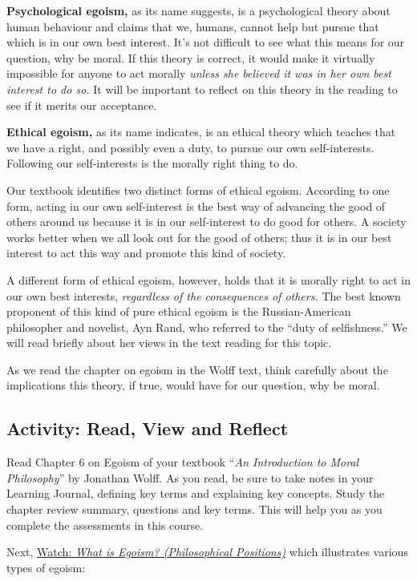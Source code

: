 \documentclass[
]{book}
\begin{document}
\textbf{Psychological egoism,} as its name suggests, is a psychological theory about human behaviour and claims that we, humans, cannot help but pursue that which is in our own best interest. It's not difficult to see what this means for our question, why be moral. If this theory is correct, it would make it virtually impossible for anyone to act morally \emph{unless she believed it was in her own best interest to do so.} It will be important to reflect on this theory in the reading to see if it merits our acceptance.

\textbf{Ethical egoism,} as its name indicates, is an ethical theory which teaches that we have a right, and possibly even a duty, to pursue our own self-interests. Following our self-interests is the morally right thing to do.

Our textbook identifies two distinct forms of ethical egoism. According to one form, acting in our own self-interest is the best way of advancing the good of others around us because it is in our self-interest to do good for others. A society works better when we all look out for the good of others; thus it is in our best interest to act this way and promote this kind of society.

A different form of ethical egoism, however, holds that it is morally right to act in our own best interests, \emph{regardless of the consequences of others.} The best known proponent of this kind of pure ethical egoism is the Russian-American philosopher and novelist, Ayn Rand, who referred to the ``duty of selfishness.'' We will read briefly about her views in the text reading for this topic.

As we read the chapter on egoism in the Wolff text, think carefully about the implications this theory, if true, would have for our question, why be moral.

\hypertarget{activity-read-view-and-reflect-1}{%
\subsection*{Activity: Read, View and Reflect}\label{activity-read-view-and-reflect-1}}

\begin{reflect}
Read Chapter 6 on Egoism of your textbook ``\emph{An Introduction to Moral Philosophy}'' by Jonathan Wolff. As you read, be sure to take notes in your Learning Journal, defining key terms and explaining key concepts. Study the chapter review summary, questions and key terms. This will help you as you complete the assessments in this course.

Next, \href{https://www.youtube.com/watch?v=jpHggd-3_rM}{Watch: \emph{What is Egoism? (Philosophical Positions)}} which illustrates various types of egoism:
\end{reflect}
\end{document}
